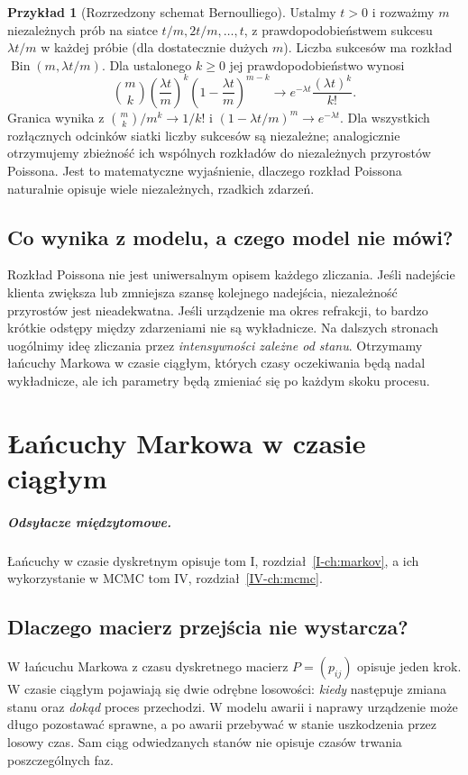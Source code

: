 \documentclass[11pt,a4paper,oneside]{report}
\numberwithin{equation}{chapter}
\theoremstyle{plain}
\theoremstyle{definition}
\newtheorem{przyklad}{Przykład}[chapter]
\theoremstyle{remark}
\begin{document}
\begin{przyklad}[Rozrzedzony schemat Bernoulliego]
Ustalmy $t>0$ i rozważmy $m$ niezależnych prób
na siatce $t/m,2t/m,\ldots,t$, z prawdopodobieństwem
sukcesu $\lambda t/m$ w każdej próbie (dla dostatecznie
dużych $m$). Liczba sukcesów ma rozkład
$\operatorname{Bin}(m,\lambda t/m)$.
Dla ustalonego $k\ge0$ jej prawdopodobieństwo wynosi
\[
\binom mk\left(\frac{\lambda t}{m}\right)^k
\left(1-\frac{\lambda t}{m}\right)^{m-k}
\longrightarrow e^{-\lambda t}\frac{(\lambda t)^k}{k!}.
\]
Granica wynika z
$\binom mk/m^k\to1/k!$ i
$(1-\lambda t/m)^m\to e^{-\lambda t}$.
Dla wszystkich rozłącznych odcinków siatki liczby
sukcesów są niezależne; analogicznie otrzymujemy
zbieżność ich wspólnych rozkładów do niezależnych
przyrostów Poissona. Jest to matematyczne wyjaśnienie,
dlaczego rozkład Poissona naturalnie opisuje wiele
niezależnych, rzadkich zdarzeń.
\end{przyklad}

\section{Co wynika z modelu, a czego model nie mówi?}
Rozkład Poissona nie jest uniwersalnym opisem każdego
zliczania. Jeśli nadejście klienta zwiększa lub zmniejsza
szansę kolejnego nadejścia, niezależność przyrostów jest
nieadekwatna. Jeśli urządzenie ma okres refrakcji, to
bardzo krótkie odstępy między zdarzeniami nie są wykładnicze.
Na dalszych stronach uogólnimy ideę zliczania przez
\emph{intensywności zależne od stanu}. Otrzymamy łańcuchy
Markowa w czasie ciągłym, których czasy oczekiwania będą
nadal wykładnicze, ale ich parametry będą zmieniać się
po każdym skoku procesu.
\chapter{Łańcuchy Markowa w czasie ciągłym}
\label{ch:ctmc}
\paragraph{Odsyłacze międzytomowe.} Łańcuchy w czasie dyskretnym opisuje tom I, rozdział~\ref{I-ch:markov}, a ich wykorzystanie w MCMC tom IV, rozdział~\ref{IV-ch:mcmc}.


\section{Dlaczego macierz przejścia nie wystarcza?}
W łańcuchu Markowa z czasu dyskretnego macierz $P=(p_{ij})$
opisuje jeden krok. W czasie ciągłym pojawiają się dwie odrębne
losowości: \emph{kiedy} następuje zmiana stanu oraz \emph{dokąd}
proces przechodzi. W modelu awarii i naprawy urządzenie może długo
pozostawać sprawne, a po awarii przebywać w stanie uszkodzenia
przez losowy czas. Sam ciąg odwiedzanych stanów nie opisuje
czasów trwania poszczególnych faz.
\end{document}
